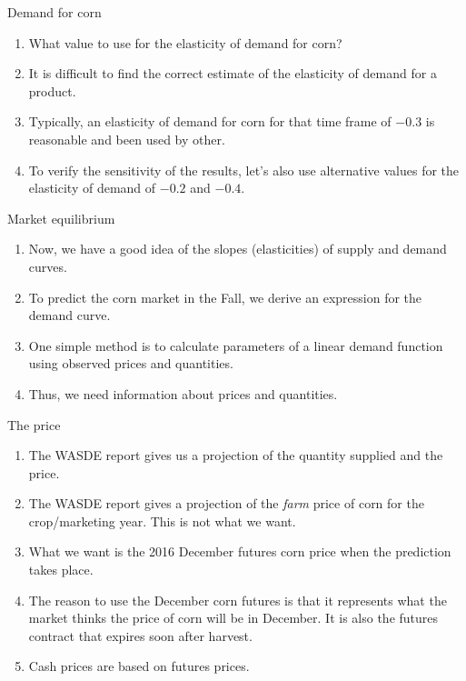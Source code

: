 \documentclass[table,xcolor=pdftex,dvipsnames, handout]{beamer}\usepackage[]{graphicx}\usepackage[]{color}
\begin{document}

\begin{frame}{Demand for corn}
\begin{enumerate}[label=\textbullet]
  \item What value to use for the elasticity of demand for corn?
  \item It is difficult to find the correct estimate of the elasticity of demand for a product.
  \item Typically, an elasticity of demand for corn for that time frame of $-0.3$ is reasonable and been used by other.
  \item To verify the sensitivity of the results, let's also use alternative values for the elasticity of demand of $-0.2$ and $-0.4$.
\end{enumerate}
\end{frame}


\begin{frame}{Market equilibrium}
\begin{enumerate}[label=\textbullet]
  \item Now, we have a good idea of the slopes (elasticities) of supply and demand curves.
  \item To predict the corn market in the Fall, we derive an expression for the demand curve.
  \item One simple method is to calculate parameters of a linear demand function using observed prices and quantities.
  \item Thus, we need information about prices and quantities.
\end{enumerate}
\end{frame}



\begin{frame}{The price}
\begin{enumerate}[label=\textbullet]
  \item The WASDE report gives us a projection of the quantity supplied and the price.
  \item The WASDE report gives a projection of the \emph{farm} price of corn for the crop/marketing year. This is not what we want.
  \item What we want is the 2016 December futures corn price when the prediction takes place.
  \item The reason to use the December corn futures is that it represents what the market thinks the price of corn will be in December. It is also the futures contract that expires soon after harvest.
  \item Cash prices are based on futures prices.
  \end{enumerate}
\end{frame}
\end{document}
